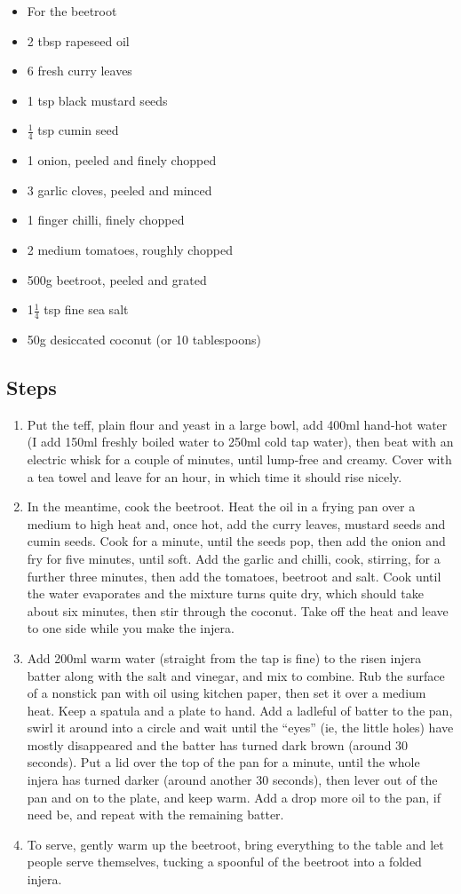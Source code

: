 \documentclass{book}
\begin{document}
\begin{itemize}
\item For the beetroot
\item 2 tbsp rapeseed oil
\item 6 fresh curry leaves
\item 1 tsp black mustard seeds
\item $\frac{1}{4}$ tsp cumin seed
\item 1 onion, peeled and finely chopped
\item 3 garlic cloves, peeled and minced
\item 1 finger chilli, finely chopped
\item 2 medium tomatoes, roughly chopped
\item 500g beetroot, peeled and grated
\item 1$\frac{1}{4}$ tsp fine sea salt
\item 50g desiccated coconut (or 10 tablespoons)
\end{itemize}

\subsection*{Steps}
\begin{enumerate}
\item Put the teff, plain flour and yeast in a large bowl, add 400ml hand-hot water (I add 150ml freshly boiled water to 250ml cold tap water), then beat with an electric whisk for a couple of minutes, until lump-free and creamy. Cover with a tea towel and leave for an hour, in which time it should rise nicely.
\item In the meantime, cook the beetroot. Heat the oil in a frying pan over a medium to high heat and, once hot, add the curry leaves, mustard seeds and cumin seeds. Cook for a minute, until the seeds pop, then add the onion and fry for five minutes, until soft. Add the garlic and chilli, cook, stirring, for a further three minutes, then add the tomatoes, beetroot and salt. Cook until the water evaporates and the mixture turns quite dry, which should take about six minutes, then stir through the coconut. Take off the heat and leave to one side while you make the injera.
\item Add 200ml warm water (straight from the tap is fine) to the risen injera batter along with the salt and vinegar, and mix to combine. Rub the surface of a nonstick pan with oil using kitchen paper, then set it over a medium heat. Keep a spatula and a plate to hand. Add a ladleful of batter to the pan, swirl it around into a circle and wait until the “eyes” (ie, the little holes) have mostly disappeared and the batter has turned dark brown (around 30 seconds). Put a lid over the top of the pan for a minute, until the whole injera has turned darker (around another 30 seconds), then lever out of the pan and on to the plate, and keep warm. Add a drop more oil to the pan, if need be, and repeat with the remaining batter.
\item To serve, gently warm up the beetroot, bring everything to the table and let people serve themselves, tucking a spoonful of the beetroot into a folded injera.
\end{enumerate}
\newpage
\end{document}
